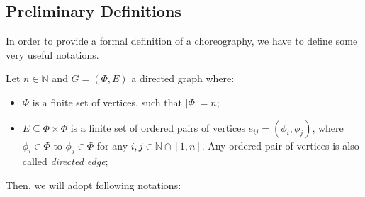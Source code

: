 \documentclass[12pt,a4paper]{report}
\newcommand{\N}{\mathbb{N}}
\begin{document}
\subsection{Preliminary Definitions}

In order to provide a formal definition of a choreography, we have to define some very useful notations. 

Let $n \in \N$ and $G = (\Phi,E)$ a directed graph where:

\begin{itemize}
	\item $\Phi$ is a finite set of vertices, such that $|\Phi| = n$;
	\item  $E \subseteq \Phi \times \Phi $ is a finite set of ordered pairs of vertices $e_{ij} = \left( \phi_i, \phi_j \right)$, where $\phi_i \in \Phi$ to $\phi_j \in \Phi$ for any $i,j \in \N \cap \left[ 1, n \right]$. Any ordered pair of vertices is also called \textit{directed edge};
\end{itemize}

Then, we will adopt following notations:
\end{document}
